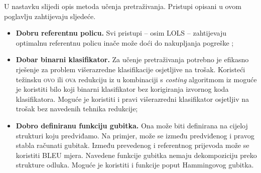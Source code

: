 U nastavku slijedi opis metoda učenja pretraživanja. Pristupi opisani u ovom
poglavlju zahtijevaju sljedeće.

\begin{itemize}

  \item \textbf{Dobru referentnu policu.} Svi pristupi -- osim \textsc{LOLS} --
  zahtijevaju optimalnu referentnu policu inače može doći do nakupljanja
  pogreške ;

  \item \textbf{Dobar binarni klasifikator.} Za učenje pretraživanja potrebno je
  efikasno rješenje za problem višerazredne klasifikacije osjetljive na trošak.
  Koristeći težinsku \textsc{ovo} ili \textsc{ova}  redukciju iz \citep{beygelzimer2005weighted,
  beygelzimer2005error} u kombinaciji s \textit{costing} algoritmom iz
  \citep{zadrozny2003cost} moguće je koristiti bilo koji binarni klasifikator
  bez korigiranja izvornog koda klasifikatora. Moguće je koristiti i pravi
  višerazredni klasifikator osjetljiv na trošak bez navedenih tehnika redukcije;

  \item \textbf{Dobro definiranu funkciju gubitka.} Ona može biti definirana na
  cijeloj strukturi koju predviđamo. Na primjer, može se između predviđenog i
  pravog stabla računati  gubitak. Između prevedenog
  i referentnog prijevoda može se koristiti BLEU  mjera. Navedene funkcije gubitka nemaju dekompoziciju preko
  strukture odluka. Moguće je koristiti i funkcije poput Hammingovog gubitka.

\end{itemize}
